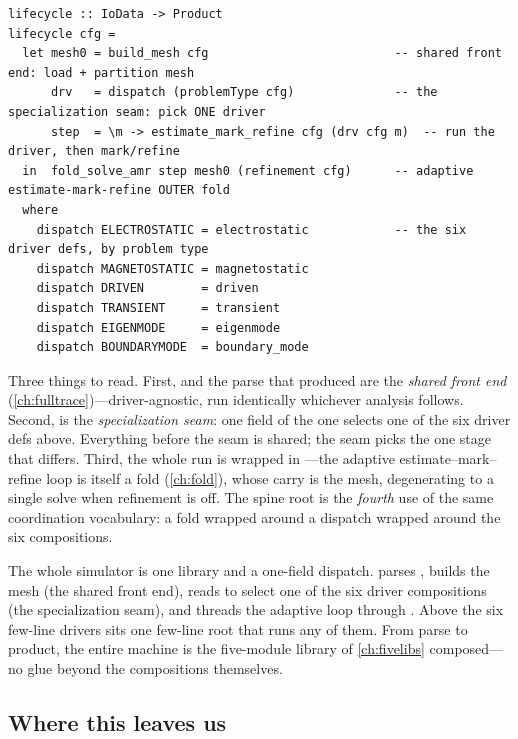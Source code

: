 \begin{lstlisting}[style=l4style]
lifecycle :: IoData -> Product
lifecycle cfg =
  let mesh0 = build_mesh cfg                          -- shared front end: load + partition mesh
      drv   = dispatch (problemType cfg)              -- the specialization seam: pick ONE driver
      step  = \m -> estimate_mark_refine cfg (drv cfg m)  -- run the driver, then mark/refine
  in  fold_solve_amr step mesh0 (refinement cfg)      -- adaptive estimate-mark-refine OUTER fold
  where
    dispatch ELECTROSTATIC = electrostatic            -- the six driver defs, by problem type
    dispatch MAGNETOSTATIC = magnetostatic
    dispatch DRIVEN        = driven
    dispatch TRANSIENT     = transient
    dispatch EIGENMODE     = eigenmode
    dispatch BOUNDARYMODE  = boundary_mode
\end{lstlisting}

\noindent Three things to read. First,  and the parse that produced
 are the \emph{shared front end} (\cref{ch:fulltrace})---driver-agnostic,
run identically whichever analysis follows. Second, 
is the \emph{specialization seam}: one field of the one  selects one of
the six driver defs above. Everything before the seam is shared; the seam picks the
one stage that differs. Third, the whole run is wrapped in ---the
adaptive estimate--mark--refine loop is itself a fold (\cref{ch:fold}), whose carry is
the mesh, degenerating to a single solve when refinement is off. The spine root is the
\emph{fourth} use of the same coordination vocabulary: a fold wrapped around a
dispatch wrapped around the six compositions.

\begin{keyidea}
The whole simulator is one library and a one-field dispatch.  parses
, builds the mesh (the shared front end), reads  to
select one of the six driver compositions (the specialization seam), and threads the
adaptive loop through . Above the six few-line drivers sits one
few-line root that runs any of them. From parse to product, the entire machine is the
five-module library of \cref{ch:fivelibs} composed---no glue beyond the compositions
themselves.
\end{keyidea}

\subsection{Where this leaves us}

